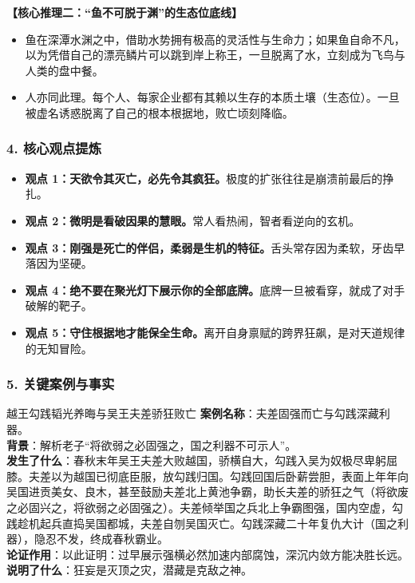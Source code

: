 \noindent\textbf{【核心推理二：“鱼不可脱于渊”的生态位底线】}
\begin{itemize}
    \item 鱼在深潭水渊之中，借助水势拥有极高的灵活性与生命力；如果鱼自命不凡，以为凭借自己的漂亮鳞片可以跳到岸上称王，一旦脱离了水，立刻成为飞鸟与人类的盘中餐。
    \item 人亦同此理。每个人、每家企业都有其赖以生存的本质土壤（生态位）。一旦被虚名诱惑脱离了自己的根本根据地，败亡顷刻降临。
\end{itemize}

\subsubsection{4. 核心观点提炼}
\begin{itemize}
    \item \textbf{观点 1：天欲令其灭亡，必先令其疯狂。}极度的扩张往往是崩溃前最后的挣扎。
    \item \textbf{观点 2：微明是看破因果的慧眼。}常人看热闹，智者看逆向的玄机。
    \item \textbf{观点 3：刚强是死亡的伴侣，柔弱是生机的特征。}舌头常存因为柔软，牙齿早落因为坚硬。
    \item \textbf{观点 4：绝不要在聚光灯下展示你的全部底牌。}底牌一旦被看穿，就成了对手破解的靶子。
    \item \textbf{观点 5：守住根据地才能保全生命。}离开自身禀赋的跨界狂飙，是对天道规律的无知冒险。
\end{itemize}

\subsubsection{5. 关键案例与事实}
\begin{CaseBox}{越王勾践韬光养晦与吴王夫差骄狂败亡}
\textbf{案例名称}：夫差固强而亡与勾践深藏利器。\\
\textbf{背景}：解析老子“将欲弱之必固强之，国之利器不可示人”。\\
\textbf{发生了什么}：春秋末年吴王夫差大败越国，骄横自大，勾践入吴为奴极尽卑躬屈膝。夫差以为越国已彻底臣服，放勾践归国。勾践回国后卧薪尝胆，表面上年年向吴国进贡美女、良木，甚至鼓励夫差北上黄池争霸，助长夫差的骄狂之气（将欲废之必固兴之，将欲弱之必固强之）。夫差倾举国之兵北上争霸图强，国内空虚，勾践趁机起兵直捣吴国都城，夫差自刎吴国灭亡。勾践深藏二十年复仇大计（国之利器），隐忍不发，终成春秋霸业。\\
\textbf{论证作用}：以此证明：过早展示强横必然加速内部腐蚀，深沉内敛方能决胜长远。\\
\textbf{说明了什么}：狂妄是灭顶之灾，潜藏是克敌之神。
\end{CaseBox}


